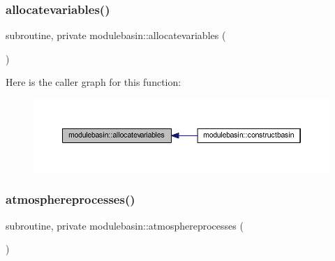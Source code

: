 \subsubsection{\texorpdfstring{allocatevariables()}{allocatevariables()}}
{\footnotesize\ttfamily subroutine, private modulebasin\+::allocatevariables (\begin{DoxyParamCaption}{ }\end{DoxyParamCaption})\hspace{0.3cm}{\ttfamily [private]}}

Here is the caller graph for this function\+:\nopagebreak
\begin{figure}[H]
\begin{center}
\leavevmode
\includegraphics[width=350pt]{namespacemodulebasin_a86eb7d3c4f70fdc55c9b4a4945a8ad9b_icgraph}
\end{center}
\end{figure}
\mbox{\label{namespacemodulebasin_a1dc5e66cf881f77967c196e5413f7ff2}} 
\subsubsection{\texorpdfstring{atmosphereprocesses()}{atmosphereprocesses()}}
{\footnotesize\ttfamily subroutine, private modulebasin\+::atmosphereprocesses (\begin{DoxyParamCaption}{ }\end{DoxyParamCaption})\hspace{0.3cm}{\ttfamily [private]}}

